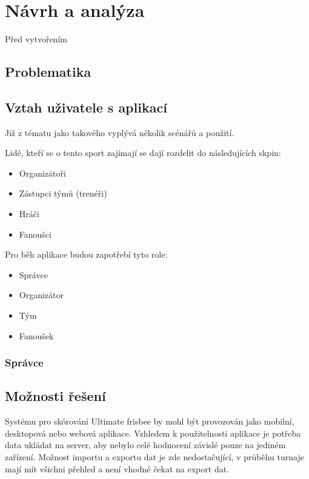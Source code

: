 \documentclass[thesis=B,czech]{FITthesis}[2012/06/26]
\begin{document}
\chapter{Návrh a analýza}
	Před vytvořením 
	
	\section{Problematika}


	\section{Vztah uživatele s aplikací}
		Již z tématu jako takového vyplývá několik scénářů a použití.

		Lidé, kteří se o tento sport zajímají se dají rozdelit do následujících skpin:

		\begin{itemize}
			\item Organizátoři
			\item Zástupci týmů (trenéři)
			\item Hráči
			\item Fanoušci
		\end{itemize}

		Pro běh aplikace budou zapotřebí tyto role:

		\begin{itemize}
			\item Správce
			\item Organizátor
			\item Tým
			\item Fanoušek
		\end{itemize}

		\subsection{Správce}




	\section{Možnosti řešení}
		Systému pro skórování Ultimate frisbee by mohl být provozován jako mobilní, desktopová nebo webová aplikace. Vzhledem k použitelnosti aplikace je potřeba data ukládat na server, aby nebylo celé hodnocení závislé pouze na jediném zařízení. Možnost importu a exportu dat je zde nedostačující, v průběhu turnaje mají mít všichni přehled a není vhodné čekat na export dat.
		
\end{document}
